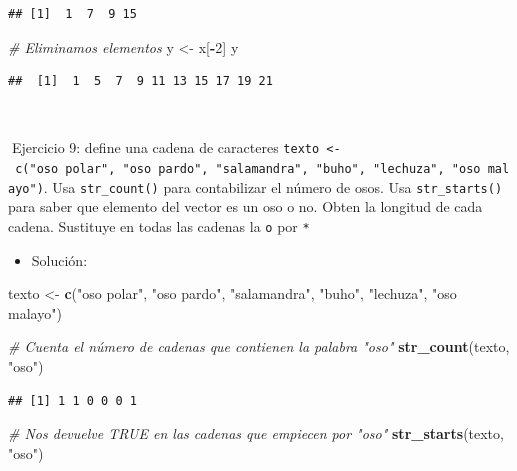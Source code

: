 \documentclass[11pt,]{book}
\newenvironment{Shaded}{\begin{snugshade}}{\end{snugshade}}
\newcommand{\CommentTok}[1]{\textcolor[rgb]{0.37,0.37,0.37}{\textit{#1}}}
\newcommand{\DecValTok}[1]{\textcolor[rgb]{0.06,0.06,0.06}{#1}}
\newcommand{\KeywordTok}[1]{\textcolor[rgb]{0.27,0.27,0.27}{\textbf{#1}}}
\newcommand{\NormalTok}[1]{#1}
\newcommand{\OperatorTok}[1]{\textcolor[rgb]{0.43,0.43,0.43}{\textbf{#1}}}
\newcommand{\StringTok}[1]{\textcolor[rgb]{0.5,0.5,0.5}{#1}}
\providecommand{\tightlist}{%
  \setlength{\itemsep}{0pt}\setlength{\parskip}{0pt}}
\begin{document}
\begin{verbatim}
## [1]  1  7  9 15
\end{verbatim}

\begin{Shaded}
\begin{Highlighting}[]
\CommentTok{# Eliminamos elementos}
\NormalTok{y <-}\StringTok{ }\NormalTok{x[}\OperatorTok{-}\DecValTok{2}\NormalTok{]}
\NormalTok{y}
\end{Highlighting}
\end{Shaded}

\begin{verbatim}
##  [1]  1  5  7  9 11 13 15 17 19 21
\end{verbatim}

~

📝Ejercicio 9: define una cadena de caracteres \texttt{texto\ \textless{}-\ c("oso\ polar",\ "oso\ pardo",\ "salamandra",\ "buho",\ "lechuza",\ "oso\ malayo")}. Usa \texttt{str\_count()} para contabilizar el número de osos. Usa \texttt{str\_starts()} para saber que elemento del vector es un oso o no. Obten la longitud de cada cadena. Sustituye en todas las cadenas la \texttt{o} por \texttt{*}

\begin{itemize}
\tightlist
\item
  Solución:
\end{itemize}

\begin{Shaded}
\begin{Highlighting}[]
\NormalTok{texto <-}\StringTok{ }\KeywordTok{c}\NormalTok{(}\StringTok{"oso polar"}\NormalTok{, }\StringTok{"oso pardo"}\NormalTok{, }\StringTok{"salamandra"}\NormalTok{, }\StringTok{"buho"}\NormalTok{, }\StringTok{"lechuza"}\NormalTok{, }\StringTok{"oso malayo"}\NormalTok{)}

\CommentTok{# Cuenta el número de cadenas que contienen la palabra "oso"}
\KeywordTok{str_count}\NormalTok{(texto, }\StringTok{"oso"}\NormalTok{)}
\end{Highlighting}
\end{Shaded}

\begin{verbatim}
## [1] 1 1 0 0 0 1
\end{verbatim}

\begin{Shaded}
\begin{Highlighting}[]
\CommentTok{# Nos devuelve TRUE en las cadenas que empiecen por "oso"}
\KeywordTok{str_starts}\NormalTok{(texto, }\StringTok{"oso"}\NormalTok{)}
\end{Highlighting}
\end{Shaded}
\end{document}
